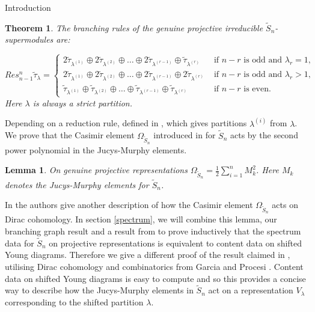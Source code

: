 \documentclass[a4paper,10pt]{amsart}
\newtheorem*{lemma*}{Lemma}
\newtheorem{theoremalpha}{Theorem}
\begin{document}
\begin{section}{Introduction}
\begin{theoremalpha} The branching rules of the genuine projective irreducible $\tilde{S}_n$-supermodules are:

$$Res^{n}_{n-1}  \tilde{\tau}_\lambda = 
\begin{cases} 
2\tilde{\tau}_{\lambda^{(1)}}\oplus 2\tilde{\tau}_{\lambda^{(2)}}\oplus \ldots \oplus  2\tilde{\tau}_{\lambda^{(r-1)}}\oplus  \tilde{\tau}_{\lambda^{(r)}} & \text{ if } n-r \text{ is odd and } \lambda_r = 1, \\
2\tilde{\tau}_{\lambda^{(1)}}\oplus 2\tilde{\tau}_{\lambda^{(2)}}\oplus \ldots \oplus  2\tilde{\tau}_{\lambda^{(r-1)}}\oplus  2\tilde{\tau}_{\lambda^{(r)}} & \text{ if } n-r \text{ is odd and } \lambda_r > 1, \\
\tilde{\tau}_{\lambda^{(1)}}\oplus \tilde{\tau}_{\lambda^{(2)}}\oplus \ldots \oplus  \tilde{\tau}_{\lambda^{(r-1)}}\oplus  \tilde{\tau}_{\lambda^{(r)}} & \text{ if } n-r \text{ is even.}\end{cases}$$
Here $\lambda$ is always a strict partition.
 \end{theoremalpha} 
Depending on a reduction rule, defined in \cite{GP92}, which gives partitions $\lambda^{(i)}$ from $\lambda$.
We prove that the Casimir element  $\Omega_{\tilde{S}_n}$  introduced in \cite{BCT12} for $\tilde{S}_n$ acts by the second power polynomial in the Jucys-Murphy elements.
\begin{lemma*} On genuine projective representations $\Omega_{\tilde{S}_n} =\frac{1}{2} \sum_{i=1}^n M_k^2$. Here  $M_k$ denotes the Jucys-Murphy elements for $\tilde{S}_n$. \end{lemma*}
In \cite[3.5]{BCT12} the authors give another description of how the Casimir element $\Omega_{\tilde{S}_n}$ acts on Dirac cohomology. 
In section \ref{spectrum}, we will combine this lemma, our branching graph result and a result from \cite{BCT12} to prove inductively that the spectrum data for $\tilde{S}_n$ on projective representations is equivalent to content data on shifted Young diagrams. Therefore we give a different proof of the result claimed in \cite{VS08}, utilising Dirac cohomology and combinatorics from Garcia and Procesi \cite{GP92}. 
Content data on shifted Young diagrams is easy to compute and so this provides a concise way to describe how the Jucys-Murphy elements in $\tilde{S}_n$ act on a representation $V_\lambda$ corresponding to the shifted partition $\lambda$.
 

\end{section}
\end{document}
